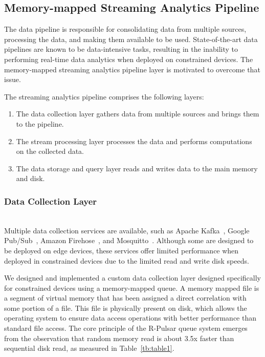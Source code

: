 
\subsection{Memory-mapped Streaming Analytics Pipeline}
The data pipeline is responsible for consolidating data from multiple sources, processing the data, and making them available to be used. State-of-the-art data pipelines are known to be data-intensive tasks, resulting in the inability to performing real-time data analytics when deployed on constrained devices. The memory-mapped streaming analytics pipeline layer is motivated to overcome that issue.

The streaming analytics pipeline comprises the following layers: 

\begin{enumerate}

\item The data collection layer gathers data from multiple sources and brings them to the pipeline.
\item The stream processing layer processes the data and performs computations on the collected data.   
\item The data storage and query layer reads and writes data to the main memory and disk.

\end{enumerate}

\vspace{1ex}
\subsubsection{Data Collection Layer}
\hfill\\
Multiple data collection services are available, such as Apache Kafka~\cite{kafka}, Google Pub/Sub~\cite{google}, Amazon Firehose~\cite{amazon}, and Mosquitto~\cite{mosquitto}. Although some are designed to be deployed on edge devices, these services offer limited performance when deployed in constrained devices due to the limited read and write disk speeds.%

We designed and implemented a custom data collection layer designed specifically for constrained devices using a memory-mapped queue. A memory mapped file is a segment of virtual memory that has been assigned a direct correlation with some portion of a file. This file is physically present on disk, which allows the operating system to ensure data access operations with better performance than standard file access. The core principle of the R-Pulsar queue system emerges from the observation that random memory read is about 3.5x faster than sequential disk read, as measured in Table~\ref{tb:table1}. 

